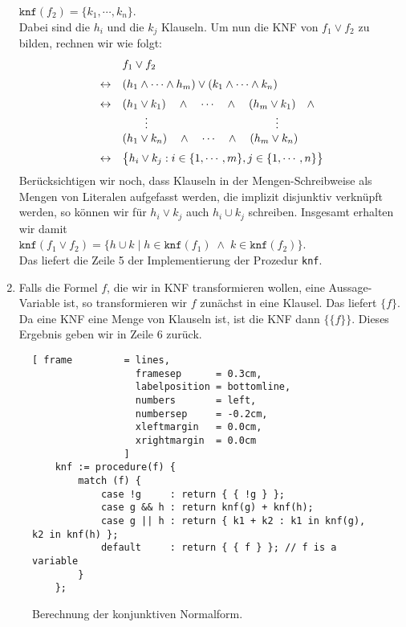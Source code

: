 \begin{enumerate}
      $\mathtt{knf}(f_2) = \{ k_1, \cdots, k_n \}$. \\[0.2cm]
      Dabei sind die $h_i$ und die $k_j$ Klauseln.  Um nun die KNF von $f_1 \vee f_2$ zu
      bilden, rechnen wir wie folgt: 
      $$
      \begin{array}[c]{ll}
        & f_1 \vee f_2  \\[0.2cm]
      \leftrightarrow & (h_1 \wedge \cdots \wedge h_m) \vee (k_1 \wedge \cdots \wedge k_n) \\[0.2cm]
      \leftrightarrow & (h_1 \vee k_1) \quad \wedge \quad \cdots \quad \wedge \quad (h_m \vee k_1) \quad \wedge \\ 
                      & \qquad \vdots     \hspace*{4cm} \vdots                \\
                      & (h_1 \vee k_n) \quad \wedge \quad \cdots \quad \wedge \quad (h_m \vee k_n) \\[0.2cm] 
      \leftrightarrow & \bigl\{ h_i \vee k_j : i \in \{ 1, \cdots, m\}, j \in \{ 1, \cdots, n \} \bigr\} \\ 
      \end{array}
      $$
      Ber\"{u}cksichtigen wir noch, dass Klauseln in der Mengen-Schreibweise als Mengen von
      Literalen aufgefasst werden, die implizit disjunktiv verkn\"{u}pft werden, so k\"{o}nnen wir
      f\"{u}r $h_i \vee k_j$ auch $h_i \cup k_j$ schreiben.  
      Insgesamt erhalten wir damit \\[0.2cm]
      \hspace*{1.3cm} 
      $\mathtt{knf}(f_1 \vee f_2) = \bigl\{ h \cup k \mid h \in \mathtt{knf}(f_1) \;\wedge\; k \in \mathtt{knf}(f_2) \bigr\}$.
      \\[0.2cm]
      Das liefert die Zeile 5 der Implementierung der Prozedur \texttt{knf}.
\item Falls die Formel $f$, die wir in KNF transformieren wollen, eine Aussage-Variable
      ist, so transformieren wir $f$ zun\"{a}chst in eine Klausel. Das liefert $\{f\}$.  
      Da eine KNF eine Menge von Klauseln ist, ist die KNF dann $\bigl\{\{f\}\bigr\}$.
      Dieses Ergebnis geben wir in Zeile 6 zur\"{u}ck.
\end{enumerate}

\begin{figure}[!ht]
  \centering
\begin{Verbatim}[ frame         = lines, 
                  framesep      = 0.3cm, 
                  labelposition = bottomline,
                  numbers       = left,
                  numbersep     = -0.2cm,
                  xleftmargin   = 0.0cm,
                  xrightmargin  = 0.0cm
                ]
    knf := procedure(f) {
        match (f) {
            case !g     : return { { !g } };
            case g && h : return knf(g) + knf(h);
            case g || h : return { k1 + k2 : k1 in knf(g), k2 in knf(h) };
            default     : return { { f } }; // f is a variable
        }
    };
\end{Verbatim}
\vspace*{-0.3cm}
  \caption{Berechnung der konjunktiven Normalform.}
  \label{fig:knf}
\end{figure}


